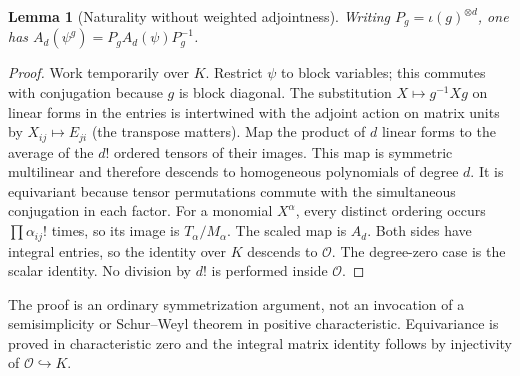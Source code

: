 \documentclass[11pt]{article}
\newtheorem{lemma}[theorem]{Lemma}
\newcommand{\OO}{\mathcal O}
\begin{document}
\begin{lemma}[Naturality without weighted adjointness]\label{lem:natural}
Writing $P_g=\iota(g)^{\otimes d}$, one has $A_d(\psi^g)=P_g A_d(\psi)P_g^{-1}$.
\end{lemma}
\begin{proof}
Work temporarily over $K$. Restrict $\psi$ to block variables; this commutes with conjugation because $g$ is block diagonal. The substitution $X\mapsto g^{-1}Xg$ on linear forms in the entries is intertwined with the adjoint action on matrix units by $X_{ij}\mapsto E_{ji}$ (the transpose matters). Map the product of $d$ linear forms to the average of the $d!$ ordered tensors of their images. This map is symmetric multilinear and therefore descends to homogeneous polynomials of degree $d$. It is equivariant because tensor permutations commute with the simultaneous conjugation in each factor. For a monomial $X^\alpha$, every distinct ordering occurs $\prod\alpha_{ij}!$ times, so its image is $T_\alpha/M_\alpha$. The scaled map is $A_d$. Both sides have integral entries, so the identity over $K$ descends to $\OO$. The degree-zero case is the scalar identity. No division by $d!$ is performed inside $\OO$.
\end{proof}
The proof is an ordinary symmetrization argument, not an invocation of a semisimplicity or Schur--Weyl theorem in positive characteristic. Equivariance is proved in characteristic zero and the integral matrix identity follows by injectivity of $\OO\hookrightarrow K$.
\end{document}
